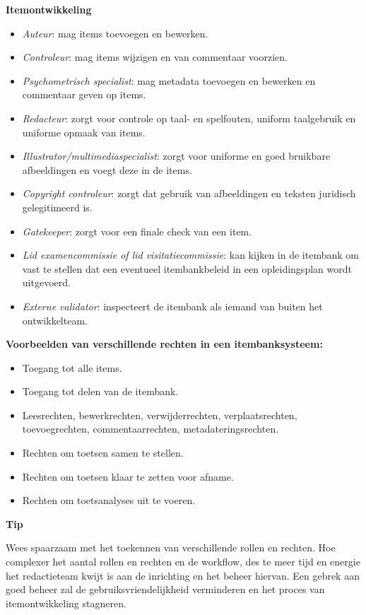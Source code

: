 \documentclass[
]{book}
\providecommand{\tightlist}{%
  \setlength{\itemsep}{0pt}\setlength{\parskip}{0pt}}
\begin{document}
\textbf{Itemontwikkeling}

\begin{itemize}
\tightlist
\item
  \emph{Auteur}: mag items toevoegen en bewerken.
\item
  \emph{Controleur}: mag items wijzigen en van commentaar voorzien.
\item
  \emph{Psychometrisch specialist}: mag metadata toevoegen en bewerken en commentaar geven op items.
\item
  \emph{Redacteur}: zorgt voor controle op taal- en spelfouten, uniform taalgebruik en uniforme opmaak van items.
\item
  \emph{Illustrator/multimediaspecialist}: zorgt voor uniforme en goed bruikbare afbeeldingen en voegt deze in de items.
\item
  \emph{Copyright controleur}: zorgt dat gebruik van afbeeldingen en teksten juridisch gelegitimeerd is.
\item
  \emph{Gatekeeper}: zorgt voor een finale check van een item.
\item
  \emph{Lid examencommissie of lid visitatiecommissie}: kan kijken in de itembank om vast te stellen dat een eventueel itembankbeleid in een opleidingsplan wordt uitgevoerd.
\item
  \emph{Externe validator}: inspecteert de itembank als iemand van buiten het ontwikkelteam.
\end{itemize}

\textbf{Voorbeelden van verschillende rechten in een itembanksysteem:}

\begin{itemize}
\tightlist
\item
  Toegang tot alle items.
\item
  Toegang tot delen van de itembank.
\item
  Leesrechten, bewerkrechten, verwijderrechten, verplaatsrechten, toevoegrechten, commentaarrechten, metadateringsrechten.
\item
  Rechten om toetsen samen te stellen.
\item
  Rechten om toetsen klaar te zetten voor afname.
\item
  Rechten om toetsanalyses uit te voeren.
\end{itemize}

\textbf{Tip}

Wees spaarzaam met het toekennen van verschillende rollen en rechten. Hoe complexer het aantal rollen en rechten en de workflow, des te meer tijd en energie het redactieteam kwijt is aan de inrichting en het beheer hiervan. Een gebrek aan goed beheer zal de gebruiksvriendelijkheid verminderen en het proces van itemontwikkeling stagneren.
\end{document}
